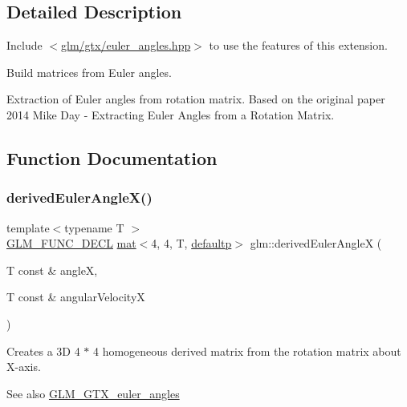\subsection{Detailed Description}
Include $<$\mbox{\hyperlink{euler__angles_8hpp}{glm/gtx/euler\+\_\+angles.\+hpp}}$>$ to use the features of this extension.

Build matrices from Euler angles.

Extraction of Euler angles from rotation matrix. Based on the original paper 2014 Mike Day -\/ Extracting Euler Angles from a Rotation Matrix. 

\subsection{Function Documentation}
\mbox{\label{group__gtx__euler__angles_ga994b8186b3b80d91cf90bc403164692f}} 
\subsubsection{\texorpdfstring{derived\+Euler\+Angle\+X()}{derivedEulerAngleX()}}
{\footnotesize\ttfamily template$<$typename T $>$ \\
\mbox{\hyperlink{setup_8hpp_ab2d052de21a70539923e9bcbf6e83a51}{G\+L\+M\+\_\+\+F\+U\+N\+C\+\_\+\+D\+E\+CL}} \mbox{\hyperlink{structglm_1_1mat}{mat}}$<$4, 4, T, \mbox{\hyperlink{namespaceglm_a36ed105b07c7746804d7fdc7cc90ff25a9d21ccd8b5a009ec7eb7677befc3bf51}{defaultp}}$>$ glm\+::derived\+Euler\+AngleX (\begin{DoxyParamCaption}\item[{T const \&}]{angleX,  }\item[{T const \&}]{angular\+VelocityX }\end{DoxyParamCaption})}

Creates a 3D 4 $\ast$ 4 homogeneous derived matrix from the rotation matrix about X-\/axis. \begin{DoxySeeAlso}{See also}
\mbox{\hyperlink{group__gtx__euler__angles}{G\+L\+M\+\_\+\+G\+T\+X\+\_\+euler\+\_\+angles}} 
\end{DoxySeeAlso}
\mbox{\label{group__gtx__euler__angles_ga0a4c56ecce7abcb69508ebe6313e9d10}} 
